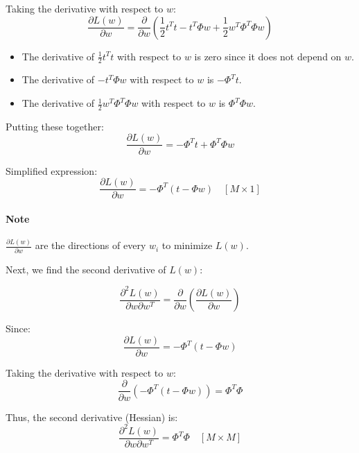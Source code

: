 \documentclass[../main.tex]{subfiles}
\begin{document}
Taking the derivative with respect to \(w\):
\begin{equation}
    \frac{\partial L(w)}{\partial w} = \frac{\partial}{\partial w} \left( \frac{1}{2} t^T t - t^T \Phi w + \frac{1}{2} w^T \Phi^T \Phi w \right)
\end{equation}

\begin{itemize}
    \item The derivative of $\frac{1}{2} t^T t$ with respect to $w$ is zero since it does not depend on $w$.
    \item The derivative of $- t^T \Phi w$ with respect to $w$ is $- \Phi^T t$.
    \item The derivative of $\frac{1}{2} w^T \Phi^T \Phi w$ with respect to $w$ is $\Phi^T \Phi w$.
\end{itemize}

Putting these together:
\begin{equation}
    \frac{\partial L(w)}{\partial w} = -\Phi^T t + \Phi^T \Phi w
\end{equation}

Simplified expression:
\begin{equation}
    \frac{\partial L(w)}{\partial w} = -\Phi^T (t - \Phi w) \quad[M \times 1]
\end{equation}

\paragraph{Note} $\frac{\partial L(w)}{\partial w}$ are the directions of every $w_i$ to minimize $L(w)$.

Next, we find the second derivative of \(L(w)\):

\begin{equation}
    \frac{\partial^2 L(w)}{\partial w \partial w^T} = \frac{\partial}{\partial w} \left( \frac{\partial L(w)}{\partial w} \right)
\end{equation}

Since:
\begin{equation}
    \frac{\partial L(w)}{\partial w} = -\Phi^T (t - \Phi w)
\end{equation}

Taking the derivative with respect to \(w\):
\begin{equation}
    \frac{\partial}{\partial w} \left( -\Phi^T (t - \Phi w) \right) = \Phi^T \Phi
\end{equation}

Thus, the second derivative (Hessian) is:
\begin{equation}
    \frac{\partial^2 L(w)}{\partial w \partial w^T} = \Phi^T \Phi \quad [M \times M]
\end{equation}
\end{document}
